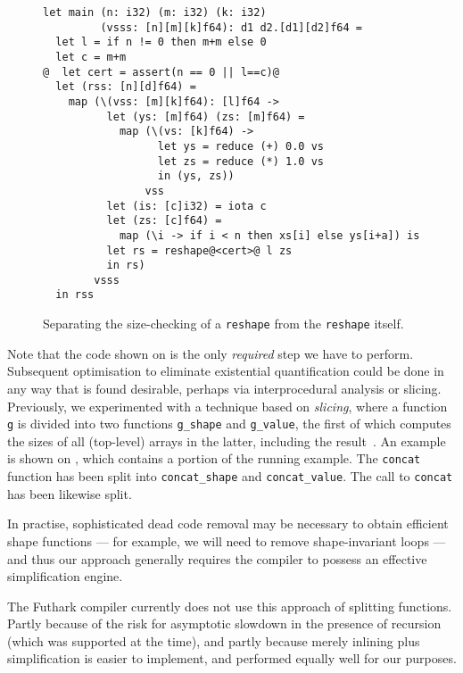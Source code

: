 \begin{figure}
\begin{lstlisting}[xleftmargin=0pt]
let main (n: i32) (m: i32) (k: i32)
         (vsss: [n][m][k]f64): d1 d2.[d1][d2]f64 =
  let l = if n != 0 then m+m else 0
  let c = m+m
@  let cert = assert(n == 0 || l==c)@
  let (rss: [n][d]f64) =
    map (\(vss: [m][k]f64): [l]f64 ->
          let (ys: [m]f64) (zs: [m]f64) =
            map (\(vs: [k]f64) ->
                  let ys = reduce (+) 0.0 vs
                  let zs = reduce (*) 1.0 vs
                  in (ys, zs))
                vss
          let (is: [c]i32) = iota c
          let (zs: [c]f64) =
            map (\i -> if i < n then xs[i] else ys[i+a]) is
          let rs = reshape@<cert>@ l zs
          in rs)
        vsss
  in rss
\end{lstlisting}

  \caption{Separating the size-checking of a \lstinline{reshape} from
    the \lstinline{reshape} itself.}
\label{fig:SimplifyFShapeCert}
\end{figure}

Note that the code shown on  is the only
\textit{required} step we have to perform.  Subsequent optimisation to
eliminate existential quantification could be done in any way that is
found desirable, perhaps via interprocedural analysis or slicing.
Previously, we experimented with a technique based on \textit{slicing},
where a function \lstinline{g} is divided into two functions
\lstinline{g_shape} and \lstinline{g_value}, the first of which
computes the sizes of all (top-level) arrays in the latter, including
the result~\cite{henriksen2014size}.  An example is shown on
, which contains a portion of the running
example.  The \lstinline{concat} function has been split into
\lstinline{concat_shape} and \lstinline{concat_value}. The call to
\lstinline{concat} has been likewise split.

In practise, sophisticated dead code removal may be necessary to
obtain efficient shape functions --- for example, we will need to
remove shape-invariant loops --- and thus our approach generally
requires the compiler to possess an effective simplification engine.

The Futhark compiler currently does not use this approach of splitting
functions.  Partly because of the risk for asymptotic slowdown in the
presence of recursion (which was supported at the time), and partly
because merely inlining plus simplification is easier to implement,
and performed equally well for our purposes.

